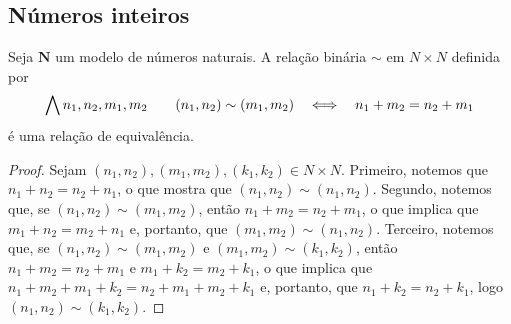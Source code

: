 \begin{comment}
6 & 6 & 10 & 16 & 20 & 26 & 30 & 36 & 40 & 46 & 50 & 56 & 60 \\ 

7 & 7 & 12 & 19 & 24 & 2\onze & 36 & 41 & 48 & 53 & 5\dez & 65 & 70 \\ 

8 & 8 & 14 & 20 & 28 & 34 & 40 & 48 & 54 & 60 & 68 & 74 & 80 \\ 

9 & 9 & 16 & 23 & 30 & 39 & 46 & 53 & 60 & 69 & 76 & 83 & 90 \\ 

\dez & \dez & 18 & 26 & 34 & 42 & 50 & 5\dez & 68 & 76 & 84 & 92 & \dez0 \\ 

\onze & \onze & 1\dez & 29 & 38 & 47 & 56 & 65 & 74 & 83 & 92 & \dez1 & \onze0 \\ 

10 & 10 & 20 & 30 & 40 & 50 & 60 & 70 & 80 & 90 & \dez0 & \onze0 & 100 \\ 
\hline 
\end{tabular}
\caption{Tabela de multiplicação}
\label{tab:alg.tabela.multiplicacao}
\end{table}

\end{comment}



\subsection{Números inteiros}

\begin{proposition}
	Seja $\bm N$ um modelo de números naturais. A relação binária $\sim$ em $N \times N$ definida por
	\begin{equation*}
	\bigwedge\nolimits n_1,n_2,m_1,m_2 \qquad (n_1,n_2) \sim (m_1,m_2) \quad \Longleftrightarrow \quad n_1+m_2=n_2+m_1
	\end{equation*}
é uma relação de equivalência.
\end{proposition}
\begin{proof}
	Sejam $(n_1,n_2), (m_1,m_2),(k_1,k_2) \in N \times N$. Primeiro, notemos que $n_1+n_2=n_2+n_1$, o que mostra que $(n_1,n_2) \sim (n_1,n_2)$. Segundo, notemos que, se $(n_1,n_2) \sim (m_1,m_2)$, então $n_1+m_2=n_2+m_1$, o que implica que $m_1+n_2=m_2+n_1$ e, portanto, que $(m_1,m_2) \sim (n_1,n_2)$. Terceiro, notemos que, se $(n_1,n_2) \sim (m_1,m_2)$ e $(m_1,m_2) \sim (k_1,k_2)$, então $n_1+m_2=n_2+m_1$ e $m_1+k_2=m_2+k_1$, o que implica que $n_1+m_2+m_1+k_2=n_2+m_1+m_2+k_1$ e, portanto, que $n_1+k_2=n_2+k_1$, logo $(n_1,n_2) \sim (k_1,k_2)$.
\end{proof}

